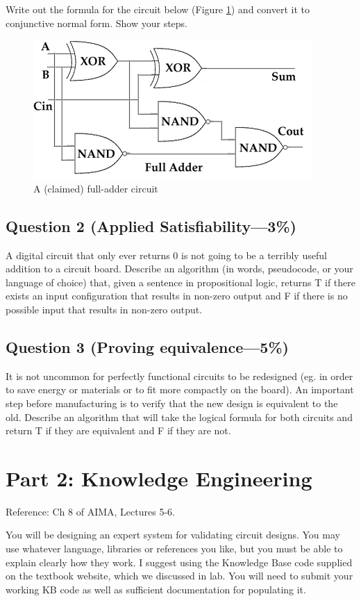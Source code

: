 \documentclass[12pt]{article}
\begin{document}
Write out the formula for the circuit below (Figure \ref{fig:adder}) and convert it to conjunctive normal form. Show your steps.
\begin{figure}[bt]
\caption{A (claimed) full-adder circuit}
\label{fig:adder}
\centering
\includegraphics[width=.6\textwidth]{full_adder.png}
\end{figure}


\subsection*{Question 2 \rm(Applied Satisfiability---3\%)}
A digital circuit that only ever returns 0 is not going to be a terribly useful addition to a circuit board. Describe an algorithm (in words, pseudocode, or your language of choice) that, given a sentence in propositional logic, returns T if there exists an input configuration that results in non-zero output and F if there is no possible input that results in non-zero output.

\subsection*{Question 3 \rm(Proving equivalence---5\%)}
It is not uncommon for perfectly functional circuits to be redesigned (eg. in order to save energy or materials or to fit more compactly on the board). An important step before manufacturing is to verify that the new design is equivalent to the old. Describe an algorithm that will take the logical formula for both circuits and return T if they are equivalent and F if they are not.

\section*{Part 2: Knowledge Engineering}
Reference: Ch 8 of AIMA, Lectures 5-6.

You will be designing an expert system for validating circuit designs. You may use whatever language, libraries or references you like, but you must be able to explain clearly how they work. I suggest using the Knowledge Base code supplied on the textbook website, which we discussed in lab. You will need to submit your working KB code as well as sufficient documentation for populating it.
\end{document}
